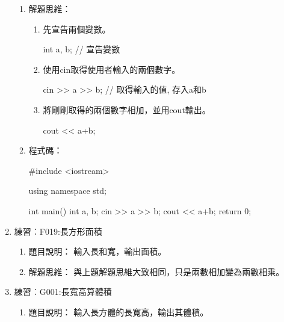 \begin{enumerate}
\begin{enumerate}
			\item 解題思維：
			\begin{enumerate}
			\item 先宣告兩個變數。
			\begin{inside}
			int a, b; // 宣告變數
			\end{inside}
			\item 使用cin取得使用者輸入的兩個數字。
			\begin{inside}
			cin >> a >> b; // 取得輸入的值, 存入a和b
			\end{inside}
			\item 將剛剛取得的兩個數字相加，並用cout輸出。
			\begin{inside}
			cout << a+b;
			\end{inside}
			\end{enumerate} 
			
			\item 程式碼：
			\begin{cppcode}
				#include <iostream>
				
				using namespace std;
				
				int main()
				{
					int a, b;
					cin >> a >> b;
					cout << a+b;
					return 0;	
				}
			\end{cppcode}
		\end{enumerate}
		
	\item 練習︰F019:長方形面積%
		\begin{enumerate}
			\item 題目說明：
			\subitem 輸入長和寬，輸出面積。
			
			\item 解題思維：
			\subitem 與上題解題思維大致相同，只是兩數相加變為兩數相乘。

		\end{enumerate}
		
	\item 練習︰G001:長寬高算體積
		\begin{enumerate}
			\item 題目說明：
			\subitem 輸入長方體的長寬高，輸出其體積。
			

\end{enumerate}
\end{enumerate}
